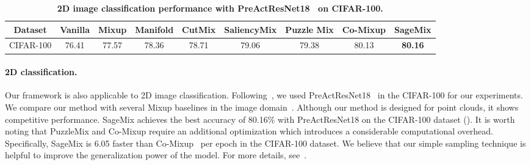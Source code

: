 \documentclass{article}
\begin{document}
\begin{table}[t!]
  \centering 
  \setlength{\tabcolsep}{2pt}
  \renewcommand{\arraystretch}{1.1}
  \caption{\textbf{2D image classification performance with PreActResNet18~\cite{he2016identity} on CIFAR-100.}}
  \label{table:2dclassification} 
  \begin{tabular}{l|ccccccc|c}
  \toprule
  \multicolumn{1}{c|}{\textbf{Dataset}}&\multicolumn{1}{c}{Vanilla}& \multicolumn{1}{c}{Mixup} &\multicolumn{1}{c}{Manifold} &
  \multicolumn{1}{c}{CutMix} &
  \multicolumn{1}{c}{SaliencyMix}&
  \multicolumn{1}{c}{Puzzle Mix} & \multicolumn{1}{c|}{Co-Mixup} &  \multicolumn{1}{c}{\textbf{SageMix}} \\
  \midrule
  \midrule
  CIFAR-100 & 76.41 & 77.57 & 78.36 & 78.71 & 79.06 & 79.38 & 80.13 & \textbf{80.16}\\
  \bottomrule
  \end{tabular}
  
\end{table} 




 \paragraph{2D classification.}
Our framework is also applicable to 2D image classification. Following~\cite{DBLP:conf/iclr/KimCJS21}, we used PreActResNet18~\cite{he2016identity} in the CIFAR-100 for our experiments. 
We compare our method with several Mixup baselines in the image domain~\cite{kim2020puzzle, DBLP:conf/iclr/KimCJS21,  DBLP:conf/iclr/UddinMSCB21, verma2019manifold, DBLP:conf/iclr/ZhangCDL18, yun2019cutmix}. 
Although our method is designed for point clouds, it shows competitive performance. 
SageMix achieves the best accuracy of 80.16\% with PreActResNet18 on the CIFAR-100 dataset (). 
It is worth noting that PuzzleMix and Co-Mixup require an additional optimization which introduces a considerable computational overhead. 
Specifically, SageMix is 6.05 faster than Co-Mixup~\cite{DBLP:conf/iclr/KimCJS21} per epoch in the CIFAR-100 dataset.
We believe that our simple sampling technique is helpful to improve the generalization power of the model. For more details, see~.
\end{document}
